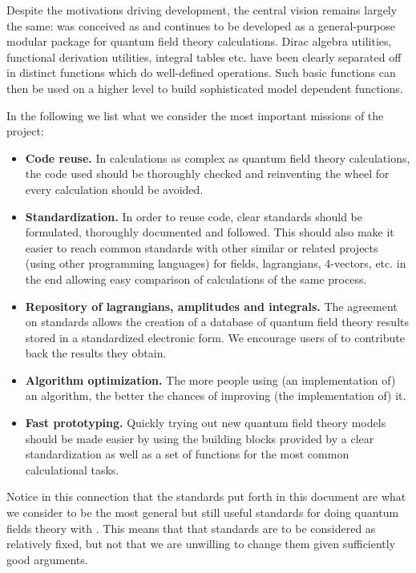Despite the motivations driving development, the central vision remains largely the same: \fc was conceived as and continues to be developed as a general-purpose modular package for quantum field theory calculations. Dirac algebra utilities, functional derivation utilities, integral tables etc. have been clearly separated off in distinct functions which do well-defined operations.  Such basic functions can then be used  on a higher level to build sophisticated model dependent functions.

In the following we list what we consider the most important missions of the \fc project:

\begin{itemize}

\item{{\bf Code reuse.} In calculations as complex as quantum field theory calculations,
the code used should be thoroughly checked and reinventing the wheel for every calculation should be avoided.}

\item{{\bf Standardization.} In order to reuse code, clear standards should be formulated, thoroughly documented and followed. This should also make it easier to reach common standards with other similar or related projects (using other programming languages) for fields, lagrangians, 4-vectors, etc. in the end allowing easy comparison of calculations of the same process.}

\item{{\bf Repository of lagrangians, amplitudes and integrals.} The agreement on standards allows the creation of a database of quantum field theory results stored in a standardized electronic form. We encourage users of \fc to contribute back the results they obtain.}

\item{{\bf Algorithm optimization.} The more people using (an implementation of) an algorithm, the better the chances of improving (the implementation of) it.}

\item{{\bf Fast prototyping.} Quickly trying out new quantum field theory models should be made easier by using the building blocks provided by a clear standardization as well as a set of functions for the most common calculational tasks.}

\end{itemize}

Notice in this connection that the standards put forth
in this document are what we consider to be the most general but still useful standards
for doing quantum fields theory with \mma. This means that that standards are
to be considered as relatively fixed, but not that we are unwilling to change them
given sufficiently good arguments.

